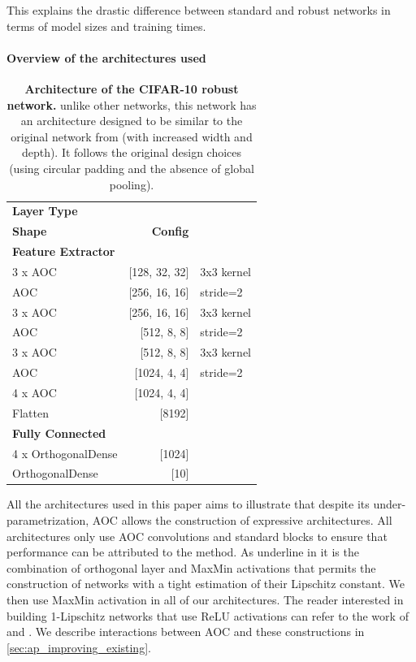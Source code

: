 This explains the drastic difference between standard and robust networks in terms of model sizes and training times. 
\paragraph{Overview of the architectures used}

    \begin{table}%
        \centering
        \begin{tabular}{lrl}
            \hline
            \textbf{Layer Type} & \makecell{\textbf{Output}\\\textbf{Shape}} & \textbf{Config} \\
            \hline
            \textbf{Feature Extractor} & & \\ 
            3 x AOC            & [128, 32, 32]  & 3x3 kernel \\
            AOC                & [256, 16, 16]  &  stride=2 \\
            3 x AOC            & [256, 16, 16]  & 3x3 kernel \\
            AOC                & [512, 8, 8]    &  stride=2 \\
            3 x AOC            & [512, 8, 8]    & 3x3 kernel \\
            AOC                & [1024, 4, 4]   &  stride=2 \\
            4 x AOC            & [1024, 4, 4]   & \\
            Flatten            & [8192]         & \\
            \hline
            \textbf{Fully Connected} & & \\
            4 x OrthogonalDense & [1024] & \\
            OrthogonalDense     & [10]   & \\
            \hline
        \end{tabular}
        \caption{\textbf{Architecture of the CIFAR-10 robust network.} unlike other networks, this network has an architecture designed to be similar to the original network from \cite{li_preventing_2019} (with increased width and depth). It follows the original design choices (using circular padding and the absence of global pooling).}
        \label{tab:cifar10_architecture_robust}
     \end{table}

    All the architectures used in this paper aims to illustrate that despite its under-parametrization, AOC allows the construction of expressive architectures. All architectures only use AOC convolutions and standard blocks to ensure that performance can be attributed to the method. As underline in \cite{anil_sorting_2019} it is the combination of orthogonal layer and MaxMin activations that permits the construction of networks with a tight estimation of their Lipschitz constant. We then use MaxMin activation in all of our architectures. The reader interested in building 1-Lipschitz networks that use ReLU activations can refer to the work of \cite{araujo_unified_2023} and \cite{wang_direct_2023}. We describe interactions between AOC and these constructions in \cref{sec:ap_improving_existing}.

